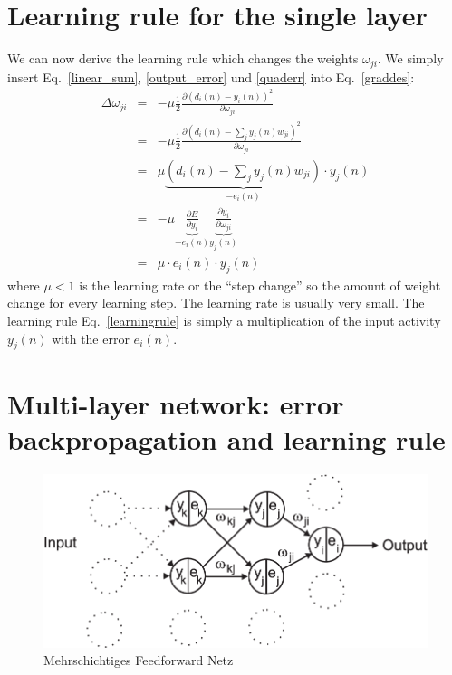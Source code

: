 \documentclass[12pt]{article}
\begin{document}
\section{Learning rule for the single layer}
We can now derive the learning rule which changes the weights $\omega_{ji}$.
We simply insert Eq.~\ref{linear_sum}, \ref{output_error} und \ref{quaderr} into Eq.~\ref{graddes}:
\begin{eqnarray}
  \Delta\omega_{ji}
   & = & - \mu \frac{1}{2} \frac{\partial ( d_i(n) - y_i(n) )^2 }{\partial \omega_{ji}} \\
   & = & - \mu \frac{1}{2} \frac{\partial \left( d_i(n) - \sum_j y_j(n) w_{ji} \right)^2 }{\partial \omega_{ji}} \\
  & = & \mu \underbrace{\left(d_i(n) - \sum_j y_j(n) w_{ji}\right)}_{-e_i(n)} \cdot y_j(n) \\
   & = & - \mu \underbrace{\frac{\partial E}{\partial y_i}}_{-e_i(n)} \underbrace{\frac{\partial y_i}{\partial \omega_{ji}}}_{y_j(n)} \label{chainrule}\\
  & = & \mu \cdot e_i(n) \cdot y_j(n) \label{learningrule}
\end{eqnarray}
where $\mu < 1$ is the learning rate or the ``step change'' so the
amount of weight change for every learning step. The learning rate is
usually very small. The learning rule Eq.~\ref{learningrule} is
simply a multiplication of the input activity $y_j(n)$ with the error
$e_i(n)$.


\section{Multi-layer network: error backpropagation and learning rule}
\begin{figure}[!hbt]
\begin{center}
\mbox{\includegraphics[width=\textwidth]{multi_layer}}
\end{center}
\caption{Mehrschichtiges Feedforward Netz
\label{multi_layer}}
\end{figure}
\end{document}
